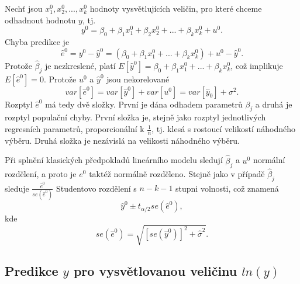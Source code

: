 Nechť jsou $x_1^0, x_2^0, ..., x_k^0$ hodnoty vysvětlujících veličin, pro které chceme odhadnout hodnotu $y$, tj.
\begin{equation}
y^0 = \beta_0 + \beta_1 x_1^0 + \beta_2 x_2^0 + ... + \beta_k x_k^0 + u^0.
\end{equation}
Chyba predikce je
\begin{equation}
\hat{e}^0 = y^0 - \hat{y}^0 = (\beta_0 + \beta_1 x_1^0 + ... + \beta_k x_k^0) + u^0 - \hat{y}^0.
\end{equation}
Protože $\hat{\beta}_j$ je nezkreslené, platí $E[\hat{y}^0] = \beta_0 + \beta_1 x_1^0 + ... + \beta_k x_k^0$, což implikuje $E[\hat{e}^0] = 0$. 
Protože $u^0$ a $\hat{y}^0$ jsou nekorelované
\begin{equation}
var[\hat{e}^0] = var[\hat{y}^0] + var[u^0] = var[\hat{y}_0] + \sigma^2.
\end{equation}
Rozptyl $\hat{e}^0$ má tedy dvě složky. První je dána odhadem parametrů $\beta_j$ a druhá je rozptyl populační chyby. První složka je, 
stejně jako rozptyl jednotlivých regresních parametrů, proporcionální k $\frac{1}{n}$, tj. klesá s rostoucí velikostí náhodného výběru. 
Druhá složka je nezávislá na velikosti náhodného výběru.

Při splnění klasických předpokladů lineárního modelu sledují $\hat{\beta}_j$ a $u^0$ normální rozdělení, a proto je $e^0$ taktéž 
normálně rozděleno. Stejně jako v případě $\hat{\beta}_j$ sleduje $\frac{\hat{e}^0}{se(\hat{e}^0)}$ Studentovo rozdělení s $n - k - 1$ 
stupni volnosti, což znamená
\begin{equation}
\hat{y}^0 \pm t_{\alpha / 2} se(\hat{e}^0),
\end{equation}
kde
\begin{equation}
se(\hat{e}^0) = \sqrt{[se(\hat{y}^0)]^2 + \hat{\sigma}^2}.
\end{equation}

\subsection{Predikce $y$ pro vysvětlovanou veličinu $ln(y)$}

